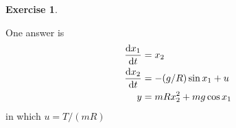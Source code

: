 \documentclass[11pt,a4paper]{report}
\theoremstyle{definition}\newtheorem{exercise}{Exercise}[chapter]
\begin{document}
\begin{exercise}
\begin{enumerate}[label=(\alph*)]
        One answer is 
        \begin{align}
            \dv{x_1}{t}&=x_2\\
            \dv{x_2}{t}&=-(g/R)\sin x_1 + u\\
            y&=mRx_2^2+mg\cos x_1
        \end{align}
        in which $u=T/(mR)$
    \end{enumerate}

    \begin{figure}[htbp]
        \centering
        \begin{tikzpicture}[x=0.75pt,y=0.75pt,yscale=-1,xscale=1]


\end{tikzpicture}
\end{figure}
\end{exercise}
\end{document}
